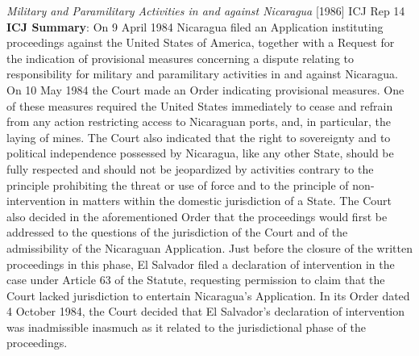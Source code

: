\begin{casedetails}{\textit{Military and Paramilitary Activities in and against Nicaragua} [1986] ICJ Rep 14}\label{case:Military and paramilitary activities in Nicaragua}
    \flushleft
    \textbf{ICJ Summary}: On 9 April 1984 Nicaragua filed an Application instituting proceedings against the United States of America, together with a Request for the indication of provisional measures concerning a dispute relating to responsibility for military and paramilitary activities in and against Nicaragua. On 10 May 1984 the Court made an Order indicating provisional measures. One of these measures required the United States immediately to cease and refrain from any action restricting access to Nicaraguan ports, and, in particular, the laying of mines. The Court also indicated that the right to sovereignty and to political independence possessed by Nicaragua, like any other State, should be fully respected and should not be jeopardized by activities contrary to the principle prohibiting the threat or use of force and to the principle of non-intervention in matters within the domestic jurisdiction of a State. The Court also decided in the aforementioned Order that the proceedings would first be addressed to the questions of the jurisdiction of the Court and of the admissibility of the Nicaraguan Application. Just before the closure of the written proceedings in this phase, El Salvador filed a declaration of intervention in the case under Article 63 of the Statute, requesting permission to claim that the Court lacked jurisdiction to entertain Nicaragua's Application. In its Order dated 4 October 1984, the Court decided that El Salvador's declaration of intervention was inadmissible inasmuch as it related to the jurisdictional phase of the proceedings.

    \vspace{\baselineskip}


\end{casedetails}
